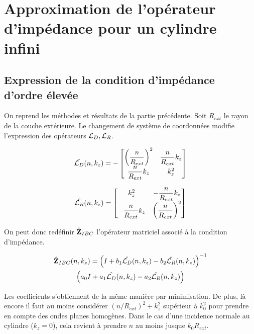\section{Approximation de l'opérateur d'impédance pour un cylindre infini}

  \subsection{Expression de la condition d'impédance d'ordre élevée}

    On reprend les méthodes et résultats de la partie précédente.
    Soit \(R_{ext}\) le rayon de la couche extérieure.
    Le changement de système de coordonnées modifie l'expression des opérateurs \({\mathcal{L}_D}, {\mathcal{L}_R}\).

    \begin{equation}
      \hat{{\mathcal{L}_D}}(n,k_z) = -
      \begin{bmatrix}
        \left(\dfrac{n}{R_{ext}}\right)^2 & \dfrac{n}{R_{ext}} k_z
        \\
        \dfrac{n}{R_{ext}} k_z & k_z^2
      \end{bmatrix}
    \end{equation}

    \begin{equation}
      \hat{{\mathcal{L}_R}}(n,k_z) =
      \begin{bmatrix}
        k_z^2 & -\dfrac{n}{R_{ext}} k_z
        \\
        -\dfrac{n}{R_{ext}} k_z & \left(\dfrac{n}{R_{ext}}\right)^2
      \end{bmatrix}
    \end{equation}

    On peut donc redéfinir \(\hat{\mathbf{Z}}_{IBC}\) l’opérateur matriciel associé à la condition d'impédance.

    \begin{multline}
        \hat{\mathbf{Z}}_{IBC}(n,k_z) = \left(I + b_1 \hat{{\mathcal{L}_D}}(n,k_z) - b_2 \hat{{\mathcal{L}_R}}(n,k_z) \right)^{-1}\\
        \left(a_0 I + a_1 \hat{{\mathcal{L}_D}}(n,k_z) - a_2 \hat{{\mathcal{L}_R}}(n,k_z)\right)
    \end{multline}

    Les coefficients s'obtiennent de la même manière par minimisation.
    De plus, là encore il faut au moins considérer \((n\slash R_{ext})^2 + k_z^2\) supérieur à \(k_0^2\) pour prendre en compte des ondes planes homogènes. Dans le cas d'une incidence normale au cylindre (\(k_z = 0 \)), cela revient à prendre \(n\) au moins jusque \(k_0 R_{ext}\).

